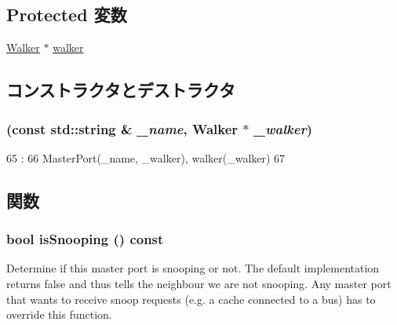 \subsection*{Protected 変数}
\begin{DoxyCompactItemize}
\item 
\hyperlink{classX86ISA_1_1Walker}{Walker} $\ast$ \hyperlink{classX86ISA_1_1Walker_1_1WalkerPort_a54537e5fcbe2d6f609ca4c90a48a06a8}{walker}
\end{DoxyCompactItemize}


\subsection{コンストラクタとデストラクタ}
\hypertarget{classX86ISA_1_1Walker_1_1WalkerPort_ab7603032aae051924e96f62a91a4e42d}{
\subsubsection[{WalkerPort}]{ (const std::string \& {\em \_\-name}, \/  {\bf Walker} $\ast$ {\em \_\-walker})}}
\label{classX86ISA_1_1Walker_1_1WalkerPort_ab7603032aae051924e96f62a91a4e42d}



\begin{DoxyCode}
65                                                                  :
66                   MasterPort(_name, _walker), walker(_walker)
67             {}

\end{DoxyCode}


\subsection{関数}
\hypertarget{classX86ISA_1_1Walker_1_1WalkerPort_a5ce11b7a254d3cb756d94568f7cbc25d}{
\subsubsection[{isSnooping}]{\setlength{\rightskip}{0pt plus 5cm}bool isSnooping () const}}
\label{classX86ISA_1_1Walker_1_1WalkerPort_a5ce11b7a254d3cb756d94568f7cbc25d}
Determine if this master port is snooping or not. The default implementation returns false and thus tells the neighbour we are not snooping. Any master port that wants to receive snoop requests (e.g. a cache connected to a bus) has to override this function.

